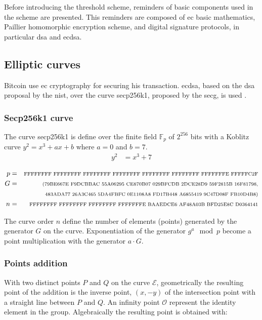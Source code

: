 Before introducing the threshold scheme, reminders of basic components used in
the scheme are presented. This reminders are composed of \gls{ec} basic
mathematics, Paillier homomorphic encryption scheme, and digital signature
protocols, in particular \gls{dsa} and \gls{ecdsa}.

\subsection{Elliptic curves}

Bitcoin use \gls{ec} cryptography for securing his transaction. \gls{ecdsa},
based on the \gls{dsa} proposal by the \gls{nist}, over the curve secp256k1,
proposed by the \gls{secg}, is used \cite{sec2}.

\subsubsection{Secp256k1 curve}

The curve secp256k1 is define over the finite field $\mathbb{F}_p$ of $2^{256}$
bits with a Koblitz curve $y^2 = x^3 + ax + b$ where $a = 0$ and $b = 7$.
\begin{equation*}
\begin{split}
  y^2 &= x^3 + 7\\
\end{split}
\end{equation*}
\begin{equation*}
\begin{split}
  p &= &\text{\scriptsize FFFFFFFF FFFFFFFF FFFFFFFF FFFFFFFF FFFFFFFF FFFFFFFF FFFFFFFE FFFFFC2F}\\
  G &= &\text{\scriptsize (79BE667E F9DCBBAC 55A06295 CE870B07 029BFCDB 2DCE28D9 59F2815B 16F81798,}\\
    &  &\text{\scriptsize  483ADA77 26A3C465 5DA4FBFC 0E1108A8 FD17B448 A6855419 9C47D08F FB10D4B8)}\\
  n &= &\text{\scriptsize FFFFFFFF FFFFFFFF FFFFFFFF FFFFFFFE BAAEDCE6 AF48A03B BFD25E8C D0364141}
\end{split}
\end{equation*}

The curve order $n$ define the number of elements (points) generated by the
generator $G$ on the curve. Exponentiation of the generator $g^a \mod p$ become
a point multiplication with the generator $a \cdot G$.

\subsubsection{Points addition}
With two distinct points $P$ and $Q$ on the curve $\mathcal{E}$, geometrically
the resulting point of the addition is the inverse point, $(x, -y)$ of the
intersection point with a straight line between $P$ and $Q$. An infinity point
$\mathcal{O}$ represent the identity element in the group. Algebraically the
resulting point is obtained with:

